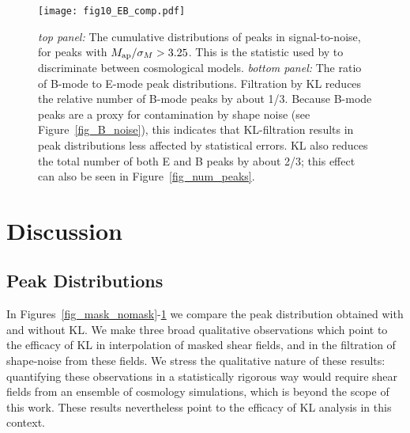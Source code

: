 \begin{figure} 
 \centering
 \texttt{[image: fig10\_EB\_comp.pdf]}
 \caption[Distributions of peaks with and without KL]{
   \textit{top panel:} The cumulative distributions of peaks in 
   signal-to-noise, for peaks with $M_{\rm ap}/\sigma_M > 3.25$.
   This is the statistic used by \citet{Dietrich10} to discriminate
   between cosmological models.  \textit{bottom panel:}  The ratio
   of B-mode to E-mode peak distributions.  Filtration by KL reduces
   the relative number of B-mode peaks by about 1/3.  Because B-mode
   peaks are a proxy for contamination by shape noise
   (see Figure~\ref{fig_B_noise}), this indicates that KL-filtration
   results in peak distributions less affected by statistical errors.
   KL also reduces the total number of both E and B peaks by about 2/3; 
   this effect can also be seen in Figure~\ref{fig_num_peaks}.
   \label{fig_EB_comp} 
 }
\end{figure}

\section{Discussion}
\label{Discussion}
\subsection{\Map Peak Distributions}
In Figures~\ref{fig_mask_nomask}-\ref{fig_EB_comp}
we compare the peak distribution obtained with and without KL.
We make three broad qualitative observations which point to the
efficacy of KL in interpolation of masked shear fields, and in
the filtration of shape-noise from these fields.  We stress the
qualitative nature of these results: quantifying 
these observations in a statistically rigorous way would require
shear fields from an ensemble of cosmology simulations, which is beyond the
scope of this work.  These results nevertheless point to the
efficacy of KL analysis in this context.

